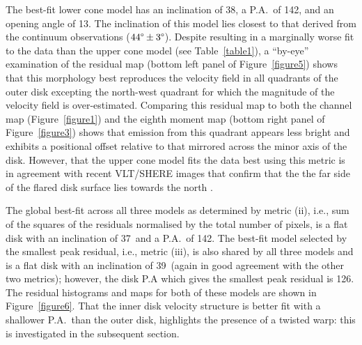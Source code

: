 \documentclass[onecolumn]{aastex6}
\begin{document}
The best-fit lower cone model has an inclination of 38\degree,  a P.A.~of
142\degree, and an opening angle of 13\degree.   The inclination of this model
lies closest to that derived from the  continuum observations ($44\degree \pm
3\degree$).   Despite resulting in a marginally worse fit to the data than  the
upper cone model (see Table~\ref{table1}), a ``by-eye''  examination of the
residual map (bottom left panel of  Figure~\ref{figure5}) shows that this
morphology best reproduces the velocity field in all quadrants  of the outer
disk excepting the north-west quadrant for  which the magnitude of the velocity
field is over-estimated.   Comparing this residual map to both the  channel map
(Figure~\ref{figure1}) and the  eighth moment map (bottom right panel of
Figure~\ref{figure3})  shows that emission from this quadrant appears less
bright  and exhibits a positional offset relative to  that mirrored across the
minor axis of the disk.   However, that the upper cone model fits the data best
using this metric is in agreement with recent VLT/SHERE images that confirm that
the  the far side of the flared disk surface lies towards the north
\citep{garufi16}.  

The global best-fit across all three models as determined by metric (ii), i.e.,
sum of the squares of the residuals normalised by the total number of pixels,
is a flat disk with an inclination of 37\degree~and a P.A.~of 142\degree.   The
best-fit model selected by the smallest peak residual,  i.e., metric (iii), is
also shared by all three models and  is a flat disk with an inclination of
39\degree~(again in good agreement  with the other two metrics); however, the
disk P.A which gives the  smallest peak residual is 126\degree.   The residual
histograms and maps for both of these models are  shown in Figure~\ref{figure6}.
That the inner disk velocity structure is better fit with a shallower  P.A.~than
the outer disk, highlights the presence of a twisted warp:  this is investigated
in the subsequent section. 
\end{document}

